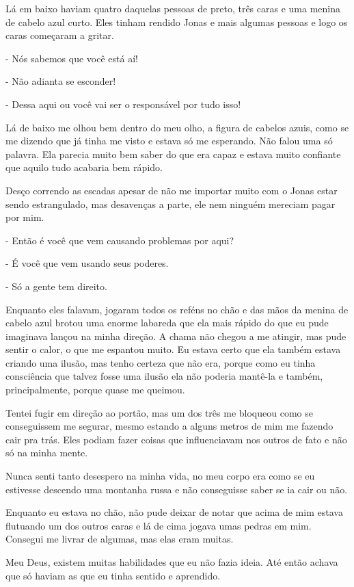 Lá em baixo haviam quatro daquelas pessoas de preto, três caras e uma menina de cabelo azul curto. Eles tinham rendido Jonas e mais algumas pessoas e logo os caras começaram a gritar.

- Nós sabemos que você está aí!

- Não adianta se esconder!

- Dessa aqui ou você vai ser o responsável por tudo isso!

Lá de baixo me olhou bem dentro do meu olho, a figura de cabelos azuis, como se me dizendo que já tinha me visto e estava só me esperando. Não falou uma só palavra. Ela parecia muito bem saber do que era capaz e estava muito confiante que aquilo tudo acabaria bem rápido.

Desço correndo as escadas apesar de não me importar muito com o Jonas estar sendo estrangulado, mas desavenças a parte, ele nem ninguém mereciam pagar por mim.

- Então é você que vem causando problemas por aqui?

- É você que vem usando seus poderes.

- Só a gente tem direito.

Enquanto eles falavam, jogaram todos os reféns no chão e das mãos da menina de cabelo azul brotou uma enorme labareda que ela mais rápido do que eu pude imaginava lançou na minha direção. A chama não chegou a me atingir, mas pude sentir o calor, o que me espantou muito. Eu estava certo que ela também estava criando uma ilusão, mas tenho certeza que não era, porque como eu tinha consciência que talvez fosse uma ilusão ela não poderia mantê-la e também, principalmente, porque quase me queimou.

Tentei fugir em direção ao portão, mas um dos três me bloqueou como se conseguissem me segurar, mesmo estando a alguns metros de mim me fazendo cair pra trás. Eles podiam fazer coisas que influenciavam nos outros de fato e não só na minha mente.

Nunca senti tanto desespero na minha vida, no meu corpo era como se eu estivesse descendo uma montanha russa e não conseguisse saber se ia cair ou não. 

Enquanto eu estava no chão, não pude deixar de notar que acima de mim estava flutuando um dos outros caras e lá de cima jogava umas pedras em mim. Consegui me livrar de algumas, mas elas eram muitas.

Meu Deus, existem muitas habilidades que eu não fazia ideia. Até então achava que só haviam as que eu tinha sentido e aprendido. 

